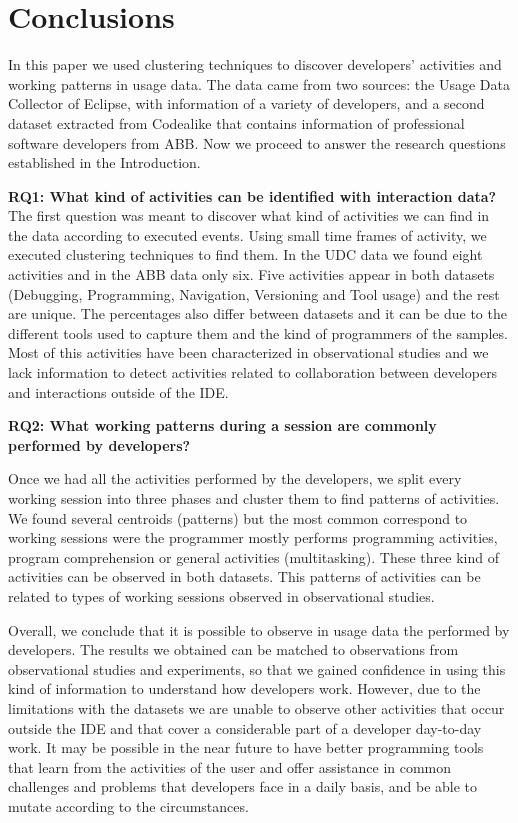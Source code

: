 \documentclass[conference]{IEEEtran}
\begin{document}
\section{Conclusions}
In this paper we used clustering techniques to discover developers' activities and working patterns in usage data. The data came from two sources: the Usage Data Collector of Eclipse, with information of a variety of developers, and a second dataset extracted from Codealike that contains information of professional software developers from ABB. Now we proceed to answer the research questions established in the Introduction.

\textbf{RQ1: What kind of activities can be identified with interaction data?}
The first question was meant to discover what kind of activities we can find in the data according to executed events. Using small time frames of activity, we executed clustering techniques to find them. In the UDC data we found eight activities and in the ABB data only six. Five activities appear in both datasets (Debugging, Programming, Navigation, Versioning and Tool usage) and the rest are unique. The percentages also differ between datasets and it can be due to the different tools used to capture them and the kind of programmers of the samples. Most of this activities have been characterized in observational studies and we lack information to detect activities related to collaboration between developers and interactions outside of the IDE.

\textbf{RQ2: What working patterns during a session are commonly performed by developers?}

Once we had all the activities performed by the developers, we split every working session into three phases and cluster them to find patterns of activities. We found several centroids (patterns) but the most common correspond to working sessions were the programmer mostly performs programming activities, program comprehension or general activities (multitasking). These three kind of activities can be observed in both datasets. This patterns of activities can be related to types of working sessions observed in observational studies.

Overall, we conclude that it is possible to observe in usage data the performed by developers. The results we obtained can be matched to observations from observational studies and experiments, so that we gained confidence in using this kind of information to understand how developers work. However, due to the limitations with the datasets we are unable to observe other activities that occur outside the IDE and that cover a considerable part of a developer day-to-day work. It may be possible in the near future to have better programming tools that learn from the activities of the user and offer assistance in common challenges and problems that developers face in a daily basis, and be able to mutate according to the circumstances.
\end{document}

